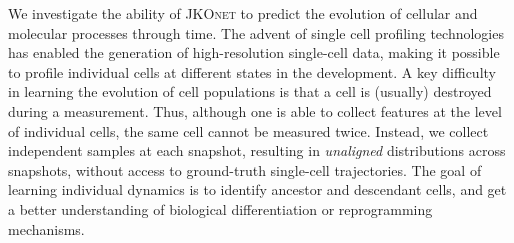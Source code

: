 \begin{table}[t]
\begin{minipage}{0.39\linewidth}
\label{tab:exp_jkonet_cell_class}
\centering
\end{minipage}
\end{table}

We investigate the ability of \textsc{JKOnet} to predict the evolution of cellular and molecular processes through time.
The advent of single cell profiling technologies has enabled the generation of high-resolution single-cell data, making it possible to profile individual cells at different states in the development. 
A key difficulty in learning the evolution of cell populations is that a cell is (usually)  destroyed during a measurement. Thus, although one is able to collect features at the level of individual cells, the same cell cannot be measured twice. Instead, we collect independent samples at each snapshot, resulting in \emph{unaligned} distributions across snapshots, without access to ground-truth single-cell trajectories. 
The goal of learning individual dynamics is to identify ancestor and descendant cells, and get a better understanding of biological differentiation or reprogramming mechanisms. 


